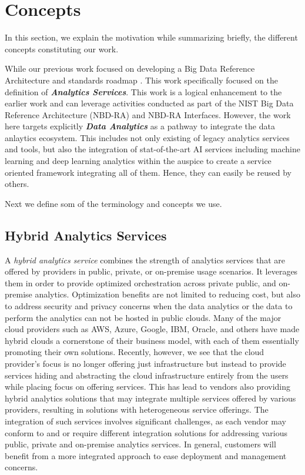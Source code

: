 

\section{Concepts}\label{s:background}

In this section, we explain the motivation while summarizing briefly,
the different concepts constituting our work.

While our previous work focused on developing a Big Data Reference
Architecture and  standards roadmap \cite{nist-v8}. This work
specifically focused on the definition of {\bf\em Analytics Services}.
This work is a logical enhancement to the earlier work and can
leverage activities conducted as part of the NIST Big Data Reference
Architecture (NBD-RA) and NBD-RA Interfaces.  However, the work here
targets explicitly {\bf\em Data Analytics} as a pathway to integrate
the data anlaytics ecosystem. This includes not only existing of
legacy analytics services and tools, but also the integration of
stat-of-the-art AI services including machine learning and deep
learning analytics within the auspice to create a service oriented
framework integrating all of them. Hence, they can easily be reused by
others.

Next we define som of the terminology and concepts we use.


\subsection{Hybrid Analytics Services}

A {\em hybrid analytics service} combines the strength of analytics
services that are offered by providers in public, private, or
on-premise usage scenarios. It leverages them in order to provide
optimized orchestration across private public, and on-premise
analytics. Optimization benefits are not limited to reducing cost, but
also to address security and privacy concerns when the data analytics
or the data to perform the analytics can not be hosted in public
clouds. Many of the major cloud providers such as AWS, Azure, Google,
IBM, Oracle, and others have made hybrid clouds a cornerstone of their
business model, with each of them essentially promoting their own
solutions. Recently, however, we see that the cloud provider's focus
is no longer offering just infrastructure but instead to provide
services hiding and abstracting the cloud infrastructure entirely from
the users while placing focus on offering services.  This has lead to
vendors also providing hybrid analytics solutions that may integrate
multiple services offered by various providers, resulting in solutions
with heterogeneous service offerings. The integration of such services
involves significant challenges, as each vendor may conform to and or
require different integration solutions for addressing various public,
private and on-premise analytics services. In general, customers will
benefit from a more integrated approach to ease deployment and
management concerns.

